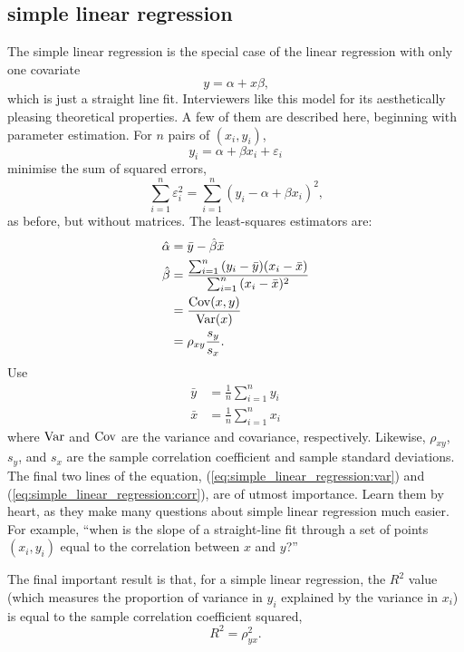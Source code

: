 \documentclass[a4paper]{article}
\begin{document}
\subsection{simple linear regression}

The simple linear regression is the special case of the linear regression with only one covariate
\[
  y = \alpha + x \beta
  \text{,}
\]
which is just a straight line fit.
Interviewers like this model for its aesthetically pleasing theoretical properties.
A few of them are described here, beginning with parameter estimation.
For $n$ pairs of $(x_i, y_i)$,
\[
  y_i = \alpha + \beta x_i + \varepsilon_i
\]
minimise the sum of squared errors,
\[
\sum_{i=1}^{n}{  \varepsilon_i^2 }
  =
\sum_{i=1}^{n}{ (y_i -  \alpha + \beta x_i)^2 }
\text{,}
\]
as before, but without matrices.
The least-squares estimators are:
\begin{align}
  \hat{\alpha} &= \bar{y} - \hat\beta \bar{x} \nonumber \\
  \hat{\beta} &=
  \frac
  {\sum_{i=1}^{n}{ (y_i - \bar{y}) (x_i - \bar{x}) }}
  {\sum_{i=1}^{n}{ (x_i - \bar{x})^2 }} \nonumber \\
  &=
  \frac
  {\operatorname{\mathrm{Cov}}(x, y)}
  {\operatorname{\mathrm{Var}}(x)} \label{eq:simple_linear_regression:var} \\
  &= \rho_{xy} \frac{s_y}{s_x} \label{eq:simple_linear_regression:corr}
  \text{.}
\end{align}
Use
\begin{align*}
\bar{y} &= \frac{1}{n}\sum_{i=1}^{n}{y_i} \\
\bar{x} &= \frac{1}{n}\sum_{i=1}^{n}{x_i}
\end{align*}
where $\operatorname{\mathrm{Var}}$ and $\operatorname{\mathrm{Cov}}$ are the variance and covariance, respectively.
Likewise,
$\rho_{xy}$,
$s_y$, and
$s_x$ are the sample correlation coefficient and sample standard deviations.
The final two lines of the equation,
(\ref{eq:simple_linear_regression:var})
and
(\ref{eq:simple_linear_regression:corr}),
are of utmost importance.
Learn them by heart, as they make many questions about simple linear regression much easier.
For example, ``when is the slope of a straight-line fit through a set of points $(x_i,y_i)$ equal to the correlation between $x$ and $y$?''

The final important result is that, for a simple linear regression, the $R^2$ value (which measures the proportion of variance in $y_i$ explained by the variance in $x_i$) is equal to the sample correlation coefficient squared,
\[
  R^2 = \rho_{yx}^2
  \text{.}
\]
\end{document}
